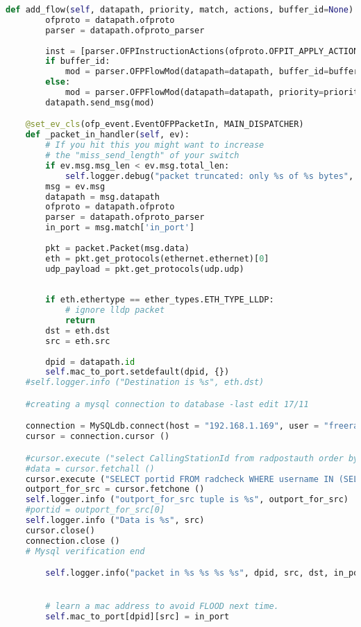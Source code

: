 \begin{lstlisting}[language = Python, caption={The User Segregation Mac Learning Application}, label={lst:userseg-code}]
	def add_flow(self, datapath, priority, match, actions, buffer_id=None):
		ofproto = datapath.ofproto
		parser = datapath.ofproto_parser
		
		inst = [parser.OFPInstructionActions(ofproto.OFPIT_APPLY_ACTIONS, actions)]
		if buffer_id: 
			mod = parser.OFPFlowMod(datapath=datapath, buffer_id=buffer_id, priority=priority, match=match, instructions=inst)
		else:
			mod = parser.OFPFlowMod(datapath=datapath, priority=priority, match=match, instructions=inst)
		datapath.send_msg(mod)

	@set_ev_cls(ofp_event.EventOFPPacketIn, MAIN_DISPATCHER)
	def _packet_in_handler(self, ev):
		# If you hit this you might want to increase
		# the "miss_send_length" of your switch
		if ev.msg.msg_len < ev.msg.total_len:
			self.logger.debug("packet truncated: only %s of %s bytes", ev.msg.msg_len, ev.msg.total_len)
		msg = ev.msg
		datapath = msg.datapath
		ofproto = datapath.ofproto
		parser = datapath.ofproto_parser
		in_port = msg.match['in_port']
		
		pkt = packet.Packet(msg.data)
		eth = pkt.get_protocols(ethernet.ethernet)[0]
		udp_payload = pkt.get_protocols(udp.udp)
		
		
		if eth.ethertype == ether_types.ETH_TYPE_LLDP:
			# ignore lldp packet
			return
		dst = eth.dst
		src = eth.src
		
		dpid = datapath.id
		self.mac_to_port.setdefault(dpid, {})
	#self.logger.info ("Destination is %s", eth.dst)	

	#creating a mysql connection to database -last edit 17/11

	connection = MySQLdb.connect(host = "192.168.1.169", user = "freerad", passwd = "pass", db = "radius")
	cursor = connection.cursor ()

	#cursor.execute ("select CallingStationId from radpostauth order by id desc LIMIT 1")
	#data = cursor.fetchall ()
	cursor.execute ("SELECT portid FROM radcheck WHERE username IN (SELECT user FROM radpostauth WHERE CallingStationId = %s AND id = (SELECT MAX(id) from radpostauth) )", src)
	outport_for_src = cursor.fetchone ()
	self.logger.info ("outport_for_src tuple is %s", outport_for_src)
	#portid = outport_for_src[0]
	self.logger.info ("Data is %s", src)	
	cursor.close()
	connection.close ()
	# Mysql verification end

		self.logger.info("packet in %s %s %s %s", dpid, src, dst, in_port)


		# learn a mac address to avoid FLOOD next time.
		self.mac_to_port[dpid][src] = in_port


\end{lstlisting}

